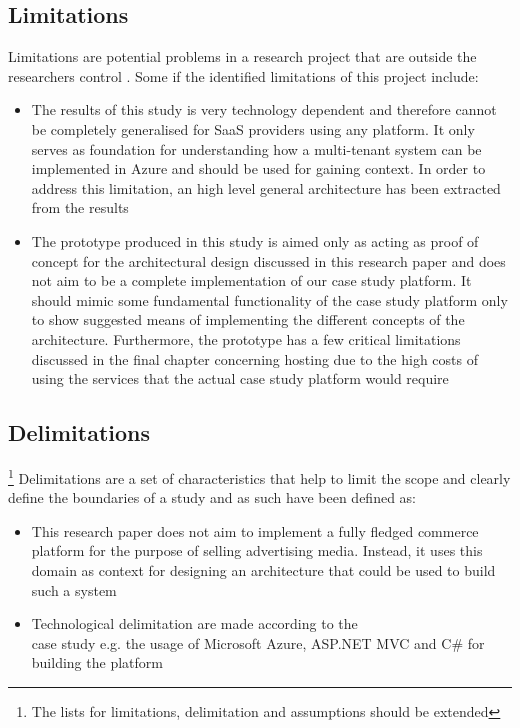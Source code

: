 \subsection{Limitations}
Limitations are potential problems in a research project that are outside the researchers control  \cite{simon2010dissertation}. Some if the identified limitations of this project include:
\begin{itemize}
\item The results of this study is very technology dependent and therefore cannot be completely generalised for SaaS providers using any platform. It only serves as foundation for understanding how a multi-tenant system can be implemented in Azure and should be used for gaining context. In order to address this limitation, an high level general architecture has been extracted from the results
\item The prototype produced in this study is aimed only as acting as proof of concept for the architectural design discussed in this research paper and does not aim to be a complete implementation of our case study platform. It should mimic some fundamental functionality of the case study platform only to show suggested means of implementing the different concepts of the architecture. Furthermore, the prototype has a few critical limitations discussed in the final chapter concerning hosting due to the high costs of using the services that the actual case study platform would require
\end{itemize}

\subsection{Delimitations} \footnote{The lists for limitations, delimitation and assumptions should be extended}
Delimitations are a set of characteristics that help to limit the scope and clearly define the boundaries of a study \cite{simon2010dissertation} and as such have been defined as:
\begin{itemize}
\item This research paper does not aim to implement a fully fledged commerce platform for the purpose of selling advertising media. Instead, it uses this domain as context for designing an architecture that could be used to build such a system
\item Technological delimitation are made according to the \\ case study e.g. the usage of Microsoft Azure, ASP.NET MVC and C\# for building the platform
\end{itemize}


